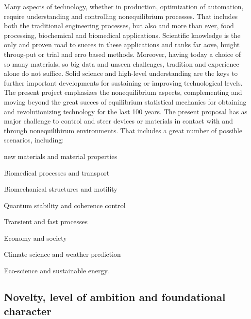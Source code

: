 Many aspects of technology, whether in production, optimization of automation, require understanding and controlling nonequilibrium processes.  That includes both the traditional engineering processes, but also and more than ever, food processing, biochemical and biomedical applications.  Scientific knowledge is the only and proven road to succes in these applications and ranks far aove, huight throug-put or trial and erro based methods.  Moreover, having today a choice of so many materials, so big data  and unseen challenges, tradition and experience alone do not suffice.  Solid science and high-level understanding are the keys to further important developments for sustaining or improving technological levels.  The present project emphasizes the nonequilibrium aspects, complementing and moving beyond the great succes of equilibrium statistical mechanics for obtaining and revolutionizing technology for the last 100 years.
The present proposal has as major challenge to control and steer devices or materials in contact with and through nonequilibirum environments.  That includes a great number of possible scenarios, including:
\begin{inparaenum}[(a)]
\item new materials and material properties
\item Biomedical processes and transport
\item Biomechanical structures and motility
\item Quantum stability and coherence control
\item Transient and fast processes
\item Economy and society
\item Climate science and weather prediction
\item Eco-science and sustainable energy.
\end{inparaenum}


\subsection{Novelty, level of ambition and foundational character}\label{sec:progress}


